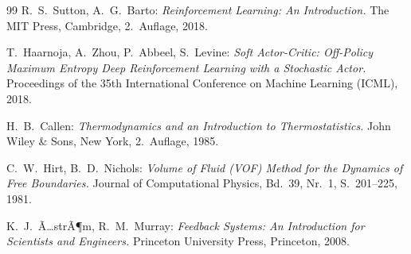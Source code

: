 ﻿\documentclass[12pt,a4paper]{article}
\theoremstyle{remark}
\begin{document}
\begin{thebibliography}{99}
	R.~S.~Sutton, A.~G.~Barto:
	\textit{Reinforcement Learning: An Introduction.}
	The MIT Press, Cambridge, 2.~Auflage, 2018.
	
	T.~Haarnoja, A.~Zhou, P.~Abbeel, S.~Levine:
	\textit{Soft Actor-Critic: Off-Policy Maximum Entropy Deep Reinforcement Learning
	with a Stochastic Actor.}
	Proceedings of the 35th International Conference on Machine Learning (ICML), 2018.
	
	H.~B.~Callen:
	\textit{Thermodynamics and an Introduction to Thermostatistics.}
	John Wiley \& Sons, New York, 2.~Auflage, 1985.
	
	C.~W.~Hirt, B.~D.~Nichols:
	\textit{Volume of Fluid (VOF) Method for the Dynamics of Free Boundaries.}
	Journal of Computational Physics, Bd.~39, Nr.~1, S.~201--225, 1981.
	
	K.~J.~Ã…strÃ¶m, R.~M.~Murray:
	\textit{Feedback Systems: An Introduction for Scientists and Engineers.}
	Princeton University Press, Princeton, 2008.
	
	\end{thebibliography}
\end{document}
